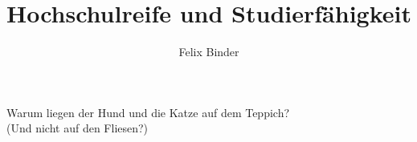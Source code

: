\documentclass{beamer}%
\title{Hochschulreife und Studierfähigkeit}
\author[Felix Binder]{Felix Binder}
\begin{document}
\begin{frame}
	\begin{center}

Warum liegen der Hund und die Katze auf dem Teppich?\\ (Und nicht auf den Fliesen?)	
	\end{center}



\end{frame}
\end{document}
